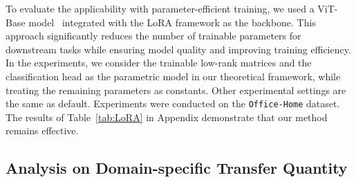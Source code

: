 
To evaluate the applicability with parameter-efficient training, we used a ViT-Base model~\cite{dosovitskiy2020vit_vitb} integrated with the LoRA framework \cite{hu2021lora} as the backbone. 
This approach significantly reduces the number of trainable parameters for downstream tasks while ensuring model quality and improving training efficiency. 
In the experiments, we consider the trainable low-rank matrices and the classification head as the parametric model in our theoretical framework, while treating the remaining parameters as constants. Other experimental settings are the same as default.
Experiments were conducted on the \texttt{Office-Home} dataset.
The results of Table~\ref{tab:LoRA} in Appendix demonstrate that our method remains effective.

\subsection{Analysis on Domain-specific Transfer Quantity }


